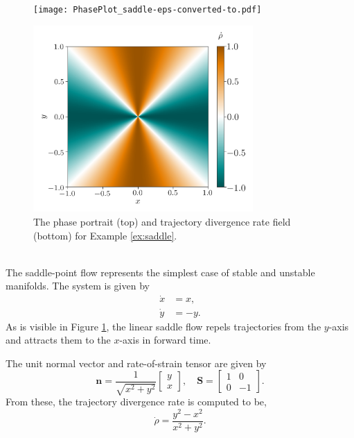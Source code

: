 \documentclass[twocolumn]{svjour3}
\begin{document}
\begin{figure}
\centering
\begin{minipage}{0.45\textwidth}
\centering
\texttt{[image: PhasePlot\_saddle-eps-converted-to.pdf]}
\end{minipage}
\begin{minipage}{0.45\textwidth}
\centering
\includegraphics[height=2.8in]{RepRate_saddle.png}
\end{minipage}
\caption{The phase portrait (top) and trajectory divergence rate field (bottom) for Example \ref{ex:saddle}.}
\label{fig:saddle}
\end{figure}

 \\
The saddle-point flow represents the simplest case of stable and unstable manifolds. The system is given by
\begin{equation}
\begin{aligned}
\dot{x} & = x, \\
\dot{y} & = -y.
\end{aligned}
\end{equation}
As is visible in Figure \ref{fig:saddle}, the linear saddle flow repels trajectories from the $y$-axis and attracts them to the $x$-axis in forward time.

The unit normal vector and rate-of-strain tensor are given by 
\begin{equation}
\mathbf{n} = \frac{1}{\sqrt{x^2+y^2}}\left[\begin{array}{c}
y \\
x
\end{array}\right], \quad
\mathbf{S} = \left[\begin{array}{cc}
1 & 0 \\
0 & -1
\end{array}\right].
\end{equation}
From these, the trajectory divergence rate is computed to be,
\begin{equation}
\dot{\rho} = \frac{y^2-x^2}{x^2+y^2}.
\label{eq:SaddleDivRate}
\end{equation}
\end{document}
